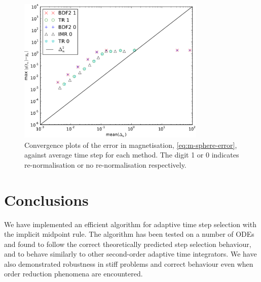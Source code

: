 
\begin{figure}
  \centering
  \includegraphics[width=0.8\textwidth]{plots/ode_llg_adaptive_convergence/maxoferrornormsvsmeanofdts}
  \caption{Convergence plots of the error in magnetisation, \cref{eq:m-sphere-error}, against average time step for each method. The digit 1 or 0 indicates re-normalisation or no re-normalisation respectively.}
  \label{fig:llg-ode-convergence-m}
\end{figure}

\section{Conclusions}

We have implemented an efficient algorithm for adaptive time step selection with the implicit midpoint rule.
The algorithm has been tested on a number of ODEs and found to follow the correct theoretically predicted step selection behaviour, and to behave similarly to other second-order adaptive time integrators.
We have also demonstrated robustness in stiff problems and correct behaviour even when order reduction phenomena are encountered.

